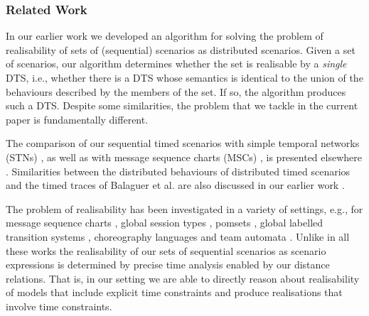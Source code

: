 \subsubsection{Related Work}
In our earlier work \cite{DTS-2025} we developed an algorithm for
solving the problem
of realisability of sets of (sequential) scenarios as distributed scenarios.
Given a set of scenarios, our algorithm determines whether
the set is realisable by a \emph{single} DTS, i.e.,
whether there is a DTS whose semantics is identical
to the union of the behaviours described by the members of
the set. If so, the algorithm produces such a DTS.
Despite some similarities, the problem that we tackle in the current
paper is fundamentally different.

The comparison of our sequential timed scenarios
with simple temporal networks (STNs) \cite{DECHTER1991}, as well as
with message sequence charts (MSCs) \cite{Harel2003,MSCs}, is presented
elsewhere \cite{DTS-2025}.
Similarities between
the distributed behaviours of distributed timed scenarios and the
timed traces of Balaguer et al. \cite{hal-2012} are also discussed
in our earlier work \cite{DTS-2025}.


The problem of realisability has been investigated in a variety of settings,
e.g., for message sequence
charts \cite{Alur-2003}, global session
types \cite{BEJLERI-2009,Castagna-2011,Honda-2016,Hans-2016},
pomsets \cite{GUANCIALE201969},
global labelled transition systems \cite{Beek-2023},
choreography languages \cite{Franco-2022} and team
automata \cite{Beek-2024}. Unlike in all
these works the realisability of our sets of sequential scenarios as
scenario expressions is
determined by precise time analysis enabled by our distance
relations.
That is, in our setting we are able to directly reason
about realisability of models that include explicit time constraints
and produce realisations that involve time constraints.
